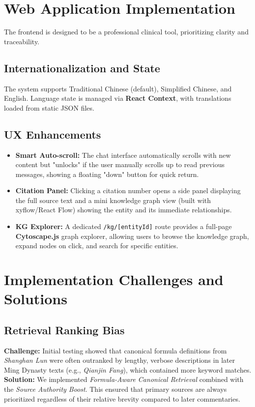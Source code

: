 \section{Web Application Implementation}

The frontend is designed to be a professional clinical tool, prioritizing clarity and traceability.

\subsection{Internationalization and State}
The system supports Traditional Chinese (default), Simplified Chinese, and English. Language state is managed via \textbf{React Context}, with translations loaded from static JSON files.

\subsection{UX Enhancements}
\begin{itemize}
    \item \textbf{Smart Auto-scroll:} The chat interface automatically scrolls with new content but "unlocks" if the user manually scrolls up to read previous messages, showing a floating "down" button for quick return.
    \item \textbf{Citation Panel:} Clicking a citation number opens a side panel displaying the full source text and a mini knowledge graph view (built with xyflow/React Flow) showing the entity and its immediate relationships.
    \item \textbf{KG Explorer:} A dedicated \texttt{/kg/[entityId]} route provides a full-page \textbf{Cytoscape.js} graph explorer, allowing users to browse the knowledge graph, expand nodes on click, and search for specific entities.
\end{itemize}

\section{Implementation Challenges and Solutions}

\subsection{Retrieval Ranking Bias}
\textbf{Challenge:} Initial testing showed that canonical formula definitions from \textit{Shanghan Lun} were often outranked by lengthy, verbose descriptions in later Ming Dynasty texts (e.g., \textit{Qianjin Fang}), which contained more keyword matches.
\textbf{Solution:} We implemented \textit{Formula-Aware Canonical Retrieval} combined with the \textit{Source Authority Boost}. This ensured that primary sources are always prioritized regardless of their relative brevity compared to later commentaries.

